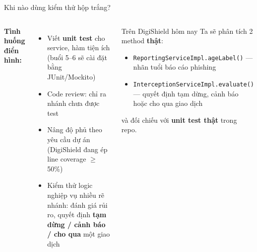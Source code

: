 \documentclass[aspectratio=169,12pt]{beamer}
\begin{document}
\begin{frame}[shrink=8]{Khi nào dùng kiểm thử hộp trắng?}
  \begin{columns}
    \textbf{Tình huống điển hình:}
    \begin{itemize}
      \item Viết \textbf{unit test} cho service, hàm tiện ích
        (buổi 5--6 sẽ cài đặt bằng JUnit/Mockito)
      \item Code review: chỉ ra nhánh chưa được test
      \item Nâng độ phủ theo yêu cầu dự án
        (DigiShield đang ép line coverage $\geq$ 50\%)
      \item Kiểm thử logic nghiệp vụ nhiều rẽ nhánh:
        đánh giá rủi ro, quyết định \textbf{tạm dừng / cảnh báo / cho qua}
        một giao dịch
    \end{itemize}

    \begin{exampleblock}{Trên DigiShield hôm nay}
      Ta sẽ phân tích 2 method \textbf{thật}:
      \begin{itemize}
        \item \texttt{ReportingServiceImpl\allowbreak.ageLabel()} --- nhãn tuổi báo cáo phishing
        \item \texttt{InterceptionServiceImpl\allowbreak.evaluate()} --- quyết định
          tạm dừng, cảnh báo hoặc cho qua giao dịch
      \end{itemize}
      và đối chiếu với \textbf{unit test thật} trong repo.
    \end{exampleblock}
  \end{columns}
\end{frame}
\end{document}
